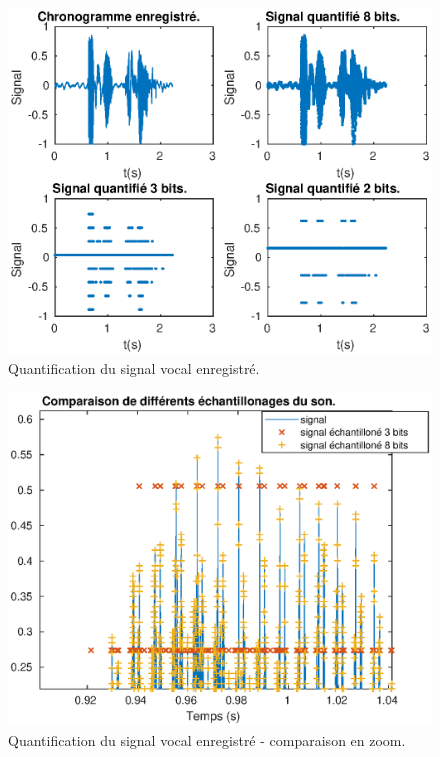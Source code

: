 \documentclass[french]{article}
\begin{document}
\begin{figure}[!h]
\centering
\includegraphics[height=0.45\textheight]{images/sonQuantifie2.eps}
\caption{Quantification du signal vocal enregistré.}
\label{sonQuantifie1}
\end{figure}

\begin{figure}[!h]
\centering
\includegraphics[height=0.45\textheight]{images/sonQuantifie.eps}
\caption{Quantification du signal vocal enregistré - comparaison en zoom.}
\label{sonQuantifie2}
\end{figure}
\end{document}
